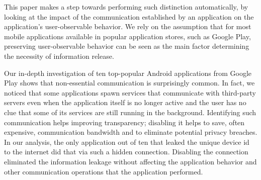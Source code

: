 
This paper makes a step towards performing such distinction automatically, 
by looking at the impact of the communication established by an application on the application's user-observable behavior. 
We rely on the assumption that for most mobile applications available in popular application stores, such as Google Play, 
preserving user-observable behavior can be seen as the main factor determining the necessity of information release. 

Our in-depth investigation of ten top-popular Android applications from Google Play shows that non-essential communication 
is surprisingly common.
In fact, we noticed that some applications spawn services that communicate with third-party servers even when the application itself is no longer active and the user has no clue that some of its services are still running in the background. 
Identifying such communication helps improving transparency; disabling it helps to save, often expensive, communication bandwidth and to eliminate potential privacy breaches. 
In our analysis, the only application out of ten that leaked the unique device id to the internet did that via such a hidden connection.
Disabling the connection eliminated the information leakage without affecting the application behavior and other communication operations that the application performed.



